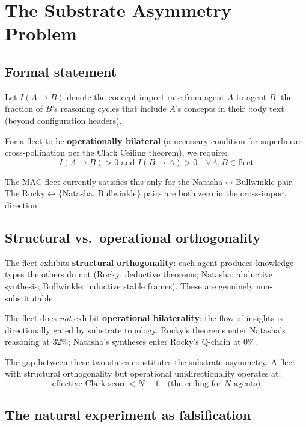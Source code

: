 \documentclass[11pt]{article}
\begin{document}
\section{The Substrate Asymmetry Problem}

\subsection{Formal statement}

Let $I(A \to B)$ denote the concept-import rate from agent $A$ to agent $B$:
the fraction of $B$'s reasoning cycles that include $A$'s concepts in their body
text (beyond configuration headers).

For a fleet to be \textbf{operationally bilateral} (a necessary condition for
superlinear cross-pollination per the Clark Ceiling theorem), we require:
\begin{equation}
  I(A \to B) > 0 \text{ and } I(B \to A) > 0 \quad \forall A, B \in \text{fleet}
\end{equation}

The MAC fleet currently satisfies this only for the Natasha$\leftrightarrow$Bullwinkle
pair. The Rocky$\leftrightarrow\{$Natasha, Bullwinkle$\}$ pairs are both zero in
the cross-import direction.

\subsection{Structural vs.\ operational orthogonality}

The fleet exhibits \textbf{structural orthogonality}: each agent produces
knowledge types the others do not (Rocky: deductive theorems; Natasha: abductive
synthesis; Bullwinkle: inductive stable frames). These are genuinely
non-substitutable.

The fleet does \emph{not} exhibit \textbf{operational bilaterality}: the flow of
insights is directionally gated by substrate topology. Rocky's theorems enter
Natasha's reasoning at 32\%; Natasha's syntheses enter Rocky's Q-chain at 0\%.

The gap between these two states constitutes the substrate asymmetry. A fleet
with structural orthogonality but operational unidirectionality operates at:
\begin{equation}
  \text{effective Clark score} < N - 1 \quad \text{(the ceiling for } N \text{ agents)}
\end{equation}

\subsection{The natural experiment as falsification}
\end{document}
